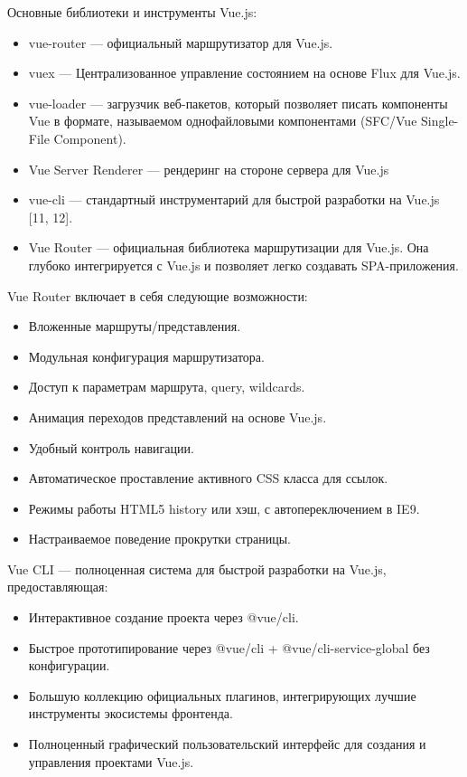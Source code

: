 Основные библиотеки и инструменты Vue.js:
\begin{itemize}
    \item vue-router — официальный маршрутизатор для Vue.js.
    \item vuex — Централизованное управление состоянием на основе Flux для Vue.js.
    \item vue-loader — загрузчик веб-пакетов, который позволяет писать компоненты Vue в формате, называемом однофайловыми компонентами (SFC/Vue Single-File Component).
    \item Vue Server Renderer — рендеринг на стороне сервера для Vue.js
    \item vue-cli — стандартный инструментарий для быстрой разработки на Vue.js [11, 12].
    \item Vue Router — официальная библиотека маршрутизации для Vue.js. Она глубоко интегрируется с Vue.js и позволяет легко создавать SPA-приложения.
\end{itemize}

Vue Router включает в себя следующие возможности:
\begin{itemize}
    \item Вложенные маршруты/представления.
    \item Модульная конфигурация маршрутизатора.
    \item Доступ к параметрам маршрута, query, wildcards.
    \item Анимация переходов представлений на основе Vue.js.
    \item Удобный контроль навигации.
    \item Автоматическое проставление активного CSS класса для ссылок.
    \item Режимы работы HTML5 history или хэш, с автопереключением в IE9.
    \item Настраиваемое поведение прокрутки страницы.
\end{itemize}

Vue CLI — полноценная система для быстрой разработки на Vue.js, предоставляющая:
\begin{itemize}
    \item Интерактивное создание проекта через @vue/cli.
    \item Быстрое прототипирование через @vue/cli + @vue/cli-service-global без конфигурации.
    \item Большую коллекцию официальных плагинов, интегрирующих лучшие инструменты экосистемы фронтенда.
    \item Полноценный графический пользовательский интерфейс для создания и управления проектами Vue.js.
\end{itemize}

